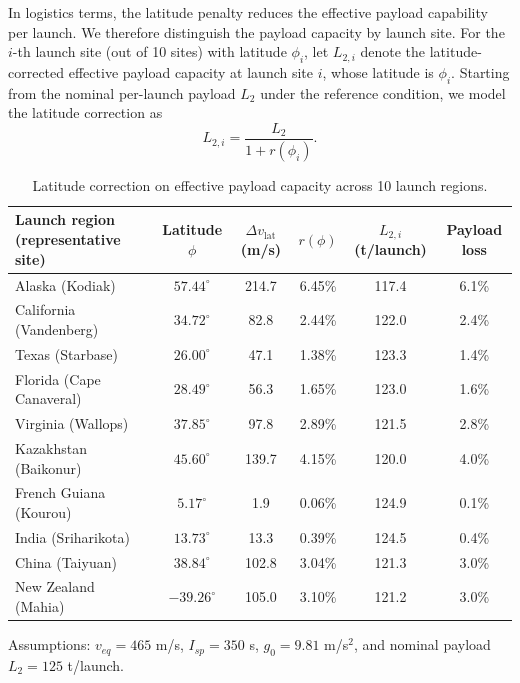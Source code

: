 \documentclass{mcmthesis}
\begin{document}
In logistics terms, the latitude penalty reduces the effective payload capability per launch. 
We therefore distinguish the payload capacity by launch site. 
For the $i$-th launch site (out of 10 sites) with latitude $\phi_i$, let $L_{2,i}$ denote the latitude-corrected effective payload capacity at launch site $i$, whose latitude is $\phi_i$. 
Starting from the nominal per-launch payload $L_2$ under the reference condition, we model the latitude correction as
\begin{equation}
L_{2,i}=\frac{L_{2}}{1+r(\phi_i)}.
\end{equation}



\begin{table}[htbp]
\centering
\caption{Latitude correction on effective payload capacity across 10 launch regions.}
\label{tab:latitude_correction_10sites}
\begin{tabular}{lccccc}
\toprule
Launch region (representative site) & Latitude $\phi$ & $\Delta v_{\text{lat}}$ (m/s) & $r(\phi)$ & $L_{2,i}$ (t/launch) & Payload loss \\
\midrule
Alaska (Kodiak)                & $57.44^\circ$  & 214.7 & 6.45\% & 117.4 & 6.1\% \\
California (Vandenberg)        & $34.72^\circ$  & 82.8  & 2.44\% & 122.0 & 2.4\% \\
Texas (Starbase)               & $26.00^\circ$  & 47.1  & 1.38\% & 123.3 & 1.4\% \\
Florida (Cape Canaveral)       & $28.49^\circ$  & 56.3  & 1.65\% & 123.0 & 1.6\% \\
Virginia (Wallops)             & $37.85^\circ$  & 97.8  & 2.89\% & 121.5 & 2.8\% \\
Kazakhstan (Baikonur)          & $45.60^\circ$  & 139.7 & 4.15\% & 120.0 & 4.0\% \\
French Guiana (Kourou)         & $5.17^\circ$   & 1.9   & 0.06\% & 124.9 & 0.1\% \\
India (Sriharikota)            & $13.73^\circ$  & 13.3  & 0.39\% & 124.5 & 0.4\% \\
China (Taiyuan)                & $38.84^\circ$  & 102.8 & 3.04\% & 121.3 & 3.0\% \\
New Zealand (Mahia)            & $-39.26^\circ$ & 105.0 & 3.10\% & 121.2 & 3.0\% \\
\bottomrule
\end{tabular}

\vspace{0.4em}
\footnotesize{
Assumptions: $v_{eq}=465$ m/s, $I_{sp}=350$ s, $g_0=9.81$ m/s$^2$, and nominal payload $L_2=125$ t/launch.
}
\end{table}
\end{document}
